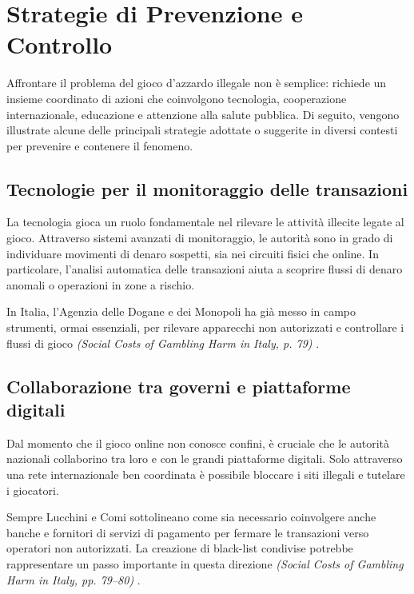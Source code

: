 \documentclass[a4paper,12pt]{article}
\begin{document}
\section{Strategie di Prevenzione e Controllo}

Affrontare il problema del gioco d’azzardo illegale non è semplice: richiede un insieme coordinato di azioni che coinvolgono tecnologia, cooperazione internazionale, educazione e attenzione alla salute pubblica. Di seguito, vengono illustrate alcune delle principali strategie adottate o suggerite in diversi contesti per prevenire e contenere il fenomeno.

\subsection{Tecnologie per il monitoraggio delle transazioni}

La tecnologia gioca un ruolo fondamentale nel rilevare le attività illecite legate al gioco. Attraverso sistemi avanzati di monitoraggio, le autorità sono in grado di individuare movimenti di denaro sospetti, sia nei circuiti fisici che online. In particolare, l'analisi automatica delle transazioni aiuta a scoprire flussi di denaro anomali o operazioni in zone a rischio.

In Italia, l’Agenzia delle Dogane e dei Monopoli ha già messo in campo strumenti, ormai essenziali, per rilevare apparecchi non autorizzati e controllare i flussi di gioco \textit{(Social Costs of Gambling Harm in Italy, p. 79)} \cite{lucchini2022socialcosts}.

\subsection{Collaborazione tra governi e piattaforme digitali}

Dal momento che il gioco online non conosce confini, è cruciale che le autorità nazionali collaborino tra loro e con le grandi piattaforme digitali. Solo attraverso una rete internazionale ben coordinata è possibile bloccare i siti illegali e tutelare i giocatori.

Sempre Lucchini e Comi sottolineano come sia necessario coinvolgere anche banche e fornitori di servizi di pagamento per fermare le transazioni verso operatori non autorizzati. La creazione di black-list condivise potrebbe rappresentare un passo importante in questa direzione \textit{(Social Costs of Gambling Harm in Italy, pp. 79--80)} \cite{lucchini2022socialcosts}.
\end{document}
